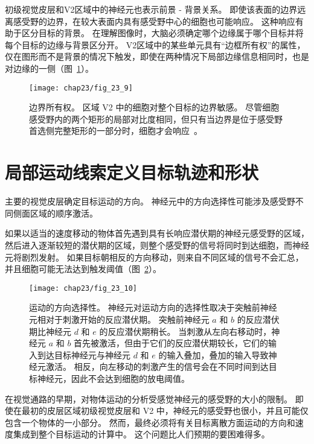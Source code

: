 初级视觉皮层和V2区域中的神经元也表示前景 - 背景关系。
即使该表面的边界远离感受野的边界，在较大表面内具有感受野中心的细胞也可能响应。
这种响应有助于区分目标的背景。
在理解图像时，大脑必须确定哪个边缘属于哪个目标并将每个目标的边缘与背景区分开。 
V2区域中的某些单元具有“边框所有权”的属性，仅在图形而不是背景的情况下触发，即使在两种情况下局部边缘信息相同时，也是对边缘的一侧（图~\ref{fig:23_9}）。


\begin{figure}[htbp]
	\centering
	\texttt{[image: chap23/fig\_23\_9]}
	\caption{边界所有权。
		区域 V2 中的细胞对整个目标的边界敏感。
		尽管细胞感受野内的两个矩形的局部对比度相同，但只有当边界是位于感受野首选侧完整矩形的一部分时，细胞才会响应~\cite{zhou2000coding}。}
	\label{fig:23_9}
\end{figure}



\section{局部运动线索定义目标轨迹和形状}

主要的视觉皮层确定目标运动的方向。
神经元中的方向选择性可能涉及感受野不同侧面区域的顺序激活。


如果以适当的速度移动的物体首先遇到具有长响应潜伏期的神经元感受野的区域，然后进入逐渐较短的潜伏期的区域，则整个感受野的信号将同时到达细胞，而神经元将剧烈发射。
如果目标朝相反的方向移动，则来自不同区域的信号不会汇总，并且细胞可能无法达到触发阈值（图~\ref{fig:23_10}）。


\begin{figure}[htbp]
	\centering
	\texttt{[image: chap23/fig\_23\_10]}
	\caption{运动的方向选择性。
		神经元对运动方向的选择性取决于突触前神经元相对于刺激开始的反应潜伏期。
		突触前神经元 $a$ 和 $b$ 的反应潜伏期比神经元 $d$ 和 $e$ 的反应潜伏期稍长。
		当刺激从左向右移动时，神经元 $a$ 和 $b$ 首先被激活，但由于它们的反应潜伏期较长，它们的输入到达目标神经元与神经元 $d$ 和 $e$ 的输入叠加，叠加的输入导致神经元激活。
		相反，向左移动的刺激产生的信号会在不同时间到达目标神经元，因此不会达到细胞的放电阈值\cite{priebe2008inhibition}。}
	\label{fig:23_10}
\end{figure}


在视觉通路的早期，对物体运动的分析受感觉神经元的感受野的大小的限制。 
即使在最初的皮层区域初级视觉皮层和 V2 中，神经元的感受野也很小，并且可能仅包含一个物体的一小部分。 
然而，最终必须将有关目标离散方面运动的方向和速度集成到整个目标运动的计算中。 
这个问题比人们预期的要困难得多。


